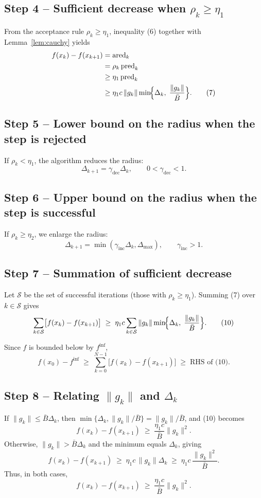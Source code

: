 \documentclass{article}
\begin{document}
\subsection*{Step 4 – Sufficient decrease when $\rho_k\ge\eta_1$}
From the acceptance rule $\rho_k\ge\eta_1$, inequality (6) together with Lemma~\ref{lem:cauchy} yields
\[
\begin{aligned}
f(x_k)-f(x_{k+1})
&= \text{ared}_k \\
&= \rho_k\,\text{pred}_k \\
&\ge \eta_1\,\text{pred}_k \\
&\ge \eta_1 c\,\|g_k\|\min\!\Bigl\{\Delta_k,\;\frac{\|g_k\|}{\bar{B}}\Bigr\}. \tag{7}
\end{aligned}
\]

\subsection*{Step 5 – Lower bound on the radius when the step is rejected}
If $\rho_k<\eta_1$, the algorithm reduces the radius:
\[
\Delta_{k+1}= \gamma_{\text{dec}}\Delta_k,\qquad 0<\gamma_{\text{dec}}<1. \tag{8}
\]

\subsection*{Step 6 – Upper bound on the radius when the step is successful}
If $\rho_k\ge\eta_2$, we enlarge the radius:
\[
\Delta_{k+1}= \min(\gamma_{\text{inc}}\Delta_k,\Delta_{\max}),\qquad \gamma_{\text{inc}}>1. \tag{9}
\]

\subsection*{Step 7 – Summation of sufficient decrease}
Let $\mathcal{S}$ be the set of successful iterations (those with $\rho_k\ge\eta_1$). Summing (7) over $k\in\mathcal{S}$ gives
\[
\sum_{k\in\mathcal{S}}\bigl[f(x_k)-f(x_{k+1})\bigr]
\;\ge\;
\eta_1 c\sum_{k\in\mathcal{S}}\|g_k\|\min\!\Bigl\{\Delta_k,\;\frac{\|g_k\|}{\bar{B}}\Bigr\}. \tag{10}
\]

Since $f$ is bounded below by $f^{\inf}$,
\[
f(x_0)-f^{\inf}\;\ge\;\sum_{k=0}^{N-1}\bigl[f(x_k)-f(x_{k+1})\bigr]
\;\ge\;\text{RHS of (10)}. \tag{11}
\]

\subsection*{Step 8 – Relating $\|g_k\|$ and $\Delta_k$}
If $\|g_k\|\le \bar{B}\Delta_k$, then $\min\{\Delta_k,\|g_k\|/\bar{B}\}=\|g_k\|/\bar{B}$, and (10) becomes
\[
f(x_k)-f(x_{k+1})\;\ge\;\frac{\eta_1 c}{\bar{B}}\|g_k\|^{2}. \tag{12}
\]
Otherwise, $\|g_k\|>\bar{B}\Delta_k$ and the minimum equals $\Delta_k$, giving
\[
f(x_k)-f(x_{k+1})\;\ge\;\eta_1 c\,\|g_k\|\Delta_k
\;\ge\;\eta_1 c\,\frac{\|g_k\|^{2}}{\bar{B}}. \tag{13}
\]
Thus, in both cases,
\[
f(x_k)-f(x_{k+1})\;\ge\;\frac{\eta_1 c}{\bar{B}}\|g_k\|^{2}. \tag{14}
\]
\end{document}
